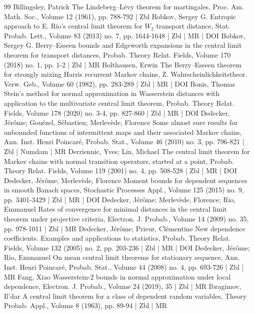 \documentclass[10pt]{amsart}
\theoremstyle{definition}\newtheorem{defi}[theo]{Definition}\newtheorem{rema}[theo]{Remark}\newtheorem{exam}[theo]{Example}\newtheorem{exem}[theo]{Example}\newtheorem{nota}[theo]{Notation}
\begin{document}
\begin{thebibliography}{99}
 Billingsley, Patrick The Lindeberg–Lévy theorem for martingales, Proc. Am. Math. Soc., Volume 12 (1961), pp. 788-792 | Zbl
 Bobkov, Sergey G. Entropic approach to E. Rio’s central limit theorem for ${W}_2$ transport distance, Stat. Probab. Lett., Volume 83 (2013) no. 7, pp. 1644-1648 | Zbl | MR | DOI
 Bobkov, Sergey G. Berry–Esseen bounds and Edgeworth expansions in the central limit theorem for transport distances, Probab. Theory Relat. Fields, Volume 170 (2018) no. 1, pp. 1-2 | Zbl | MR
 Bolthausen, Erwin The Berry–Esseen theorem for strongly mixing Harris recurrent Markov chains, Z. Wahrscheinlichkeitstheor. Verw. Geb., Volume 60 (1982), pp. 283-289 | Zbl | MR | DOI
 Bonis, Thomas Stein’s method for normal approximation in Wasserstein distances with application to the multivariate central limit theorem, Probab. Theory Relat. Fields, Volume 178 (2020) no. 3-4, pp. 827-860 | Zbl | MR | DOI
 Dedecker, Jérôme; Gouëzel, Sébastien; Merlevède, Florence Some almost sure results for unbounded functions of intermittent maps and their associated Markov chains, Ann. Inst. Henri Poincaré, Probab. Stat., Volume 46 (2010) no. 3, pp. 796-821 | Zbl | Numdam | MR
 Derriennic, Yves; Lin, Michael The central limit theorem for Markov chains with normal transition operators, started at a point, Probab. Theory Relat. Fields, Volume 119 (2001) no. 4, pp. 508-528 | Zbl | MR | DOI
 Dedecker, Jérôme; Merlevède, Florence Moment bounds for dependent sequences in smooth Banach spaces, Stochastic Processes Appl., Volume 125 (2015) no. 9, pp. 3401-3429 | Zbl | MR | DOI
 Dedecker, Jérôme; Merlevède, Florence; Rio, Emmanuel Rates of convergence for minimal distances in the central limit theorem under projective criteria, Electron. J. Probab., Volume 14 (2009) no. 35, pp. 978-1011 | Zbl | MR
 Dedecker, Jérôme; Prieur, Clémentine New dependence coefficients. Examples and applications to statistics, Probab. Theory Relat. Fields, Volume 132 (2005) no. 2, pp. 203-236 | Zbl | MR | DOI
 Dedecker, Jérôme; Rio, Emmanuel On mean central limit theorems for stationary sequence, Ann. Inst. Henri Poincaré, Probab. Stat., Volume 44 (2008) no. 4, pp. 693-726 | Zbl | MR
 Fang, Xiao Wasserstein-2 bounds in normal approximation under local dependence, Electron. J. Probab., Volume 24 (2019), 35 | Zbl | MR
 Ibragimov, Il’dar A central limit theorem for a class of dependent random variables, Theory Probab. Appl., Volume 8 (1963), pp. 89-94 | Zbl | MR

\end{thebibliography}
\end{document}
